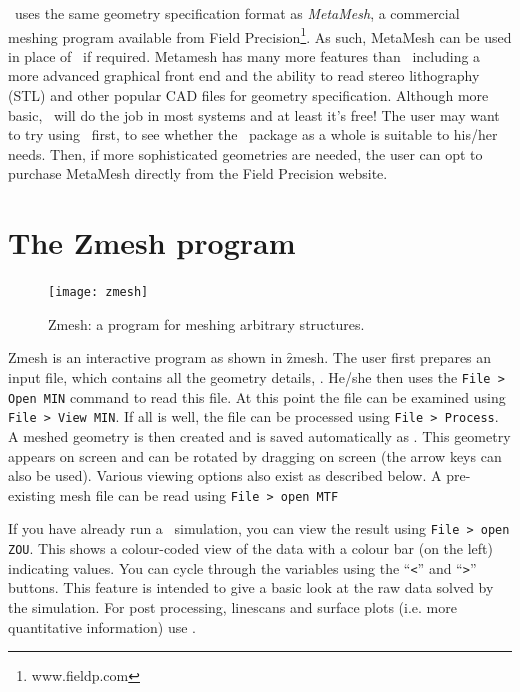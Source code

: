 \documentclass[a4paper,twoside,11pt]{book}
\begin{document}
\zmesh\ uses the same geometry specification format as
\emph{MetaMesh}, a commercial meshing program available from Field
Precision\footnote{www.fieldp.com}. As such, MetaMesh can be used in
place of \zmesh\ if required. Metamesh has many more features than
\zmesh\ including a more advanced graphical front end and the ability
to read stereo lithography (STL) and other popular CAD files for geometry
specification. Although more basic, \zmesh\ will do the job in most
systems and at least it's free! The user may want to try using
\zmesh\ first, to see whether the \zinc\ package as a whole is
suitable to his/her needs. Then, if more sophisticated geometries are
needed, the user can opt to purchase MetaMesh directly from the Field
Precision website.

\section{The Zmesh program}
\label{zmeshsec}

\begin{figure}
  \texttt{[image: zmesh]}
  \caption{Zmesh: a program for meshing arbitrary structures.}
  \label{zmesh}
\end{figure}

Zmesh is an interactive program as shown in \f{zmesh}. The user first
prepares an input file,  which contains all the geometry
details, . He/she then uses the \verb+File > Open MIN+
command to read this file. At this point the file can be examined
using \verb+File > View MIN+. If all is well, the file can be
processed using \verb+File > Process+. A meshed geometry is then
created and is saved automatically as . This geometry
appears on screen and can be rotated by dragging on screen (the arrow
keys can also be used). Various viewing options also exist as
described below. A pre-existing mesh file  can be read
using \verb+File > open MTF+

If you have already run a \zinc\ simulation, you can view the result
using \verb+File > open ZOU+. This shows a colour-coded view of the
data with a colour bar (on the left) indicating values. You
can cycle through the variables using the ``\verb+<+'' and ``\verb+>+''
buttons. This feature is intended to give a basic look at the raw data
solved by the simulation. For post processing, linescans and surface
plots (i.e. more quantitative information) use \zpp.
\end{document}
